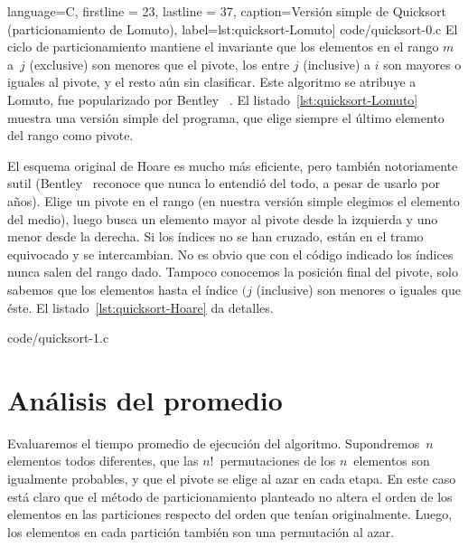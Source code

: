                    language=C,
                   firstline = 23, lastline = 37,
                   caption={Versión simple de Quicksort
                            (particionamiento de Lomuto)},
                   label=lst:quicksort-Lomuto]
                   {code/quicksort-0.c}
  El ciclo de particionamiento mantiene el invariante
  que los elementos en el rango \(m\) a~\(j\) (exclusive)
  son menores que el pivote,
  los entre \(j\) (inclusive) a \(i\) son mayores o iguales al pivote,
  y el resto aún sin clasificar.
  Este algoritmo se atribuye a Lomuto,
  fue popularizado por Bentley~%
    \cite{bentley99:_programming_pearls}.
  El listado~\ref{lst:quicksort-Lomuto}
  muestra una versión simple del programa,
  que elige siempre el último elemento del rango como pivote.

  El esquema original de Hoare es mucho más eficiente,
  pero también notoriamente sutil
  (Bentley~%
    \cite{bentley07:_most_beaut_code_i_never_wrote}
   reconoce que nunca lo entendió del todo,
   a pesar de usarlo por años).
  Elige un pivote en el rango
  (en nuestra versión simple elegimos el elemento del medio),
  luego busca un elemento mayor al pivote desde la izquierda
  y uno menor desde la derecha.
  Si los índices no se han cruzado,
  están en el tramo equivocado y se intercambian.
  No es obvio que con el código indicado
  los índices nunca salen del rango dado.
  Tampoco conocemos la posición final del pivote,
  solo sabemos que los elementos hasta el índice \((j\) (inclusive)
  son menores o iguales que éste.
  El listado~\ref{lst:quicksort-Hoare}
  da detalles.
  
                   {code/quicksort-1.c}

\section{Análisis del promedio}
\label{sec:promedio-qsort}

  Evaluaremos el tiempo promedio de ejecución del algoritmo.
  Supondremos~\(n\) elementos todos diferentes,
  que las \(n!\)~permutaciones de los \(n\)~elementos
  son igualmente probables,
  y que el pivote se elige al azar en cada etapa.
  En este caso está claro que el método de particionamiento planteado
  no altera el orden de los elementos en las particiones
  respecto del orden que tenían originalmente.
  Luego,
  los elementos en cada partición también son una permutación al azar.

